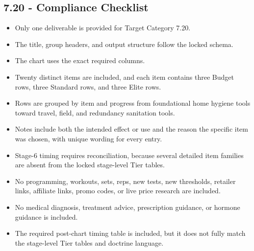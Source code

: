 \documentclass[10pt]{article}
\begin{document}
\begin{landscape}
\section*{7.20 - Compliance Checklist}
{}

\begin{itemize}
\item Only one deliverable is provided for Target Category 7.20.
\item The title, group headers, and output structure follow the locked schema.
\item The chart uses the exact required columns.
\item Twenty distinct items are included, and each item contains three Budget rows, three Standard rows, and three Elite rows.
\item Rows are grouped by item and progress from foundational home hygiene tools toward travel, field, and redundancy sanitation tools.
\item Notes include both the intended effect or use and the reason the specific item was chosen, with unique wording for every entry.
\item Stage-6 timing requires reconciliation, because several detailed item families are absent from the locked stage-level Tier tables.
\item No programming, workouts, sets, reps, new tests, new thresholds, retailer links, affiliate links, promo codes, or live price research are included.
\item No medical diagnosis, treatment advice, prescription guidance, or hormone guidance is included.
\item The required post-chart timing table is included, but it does not fully match the stage-level Tier tables and doctrine language.
\end{itemize}

\end{landscape}
\endgroup
\end{document}
